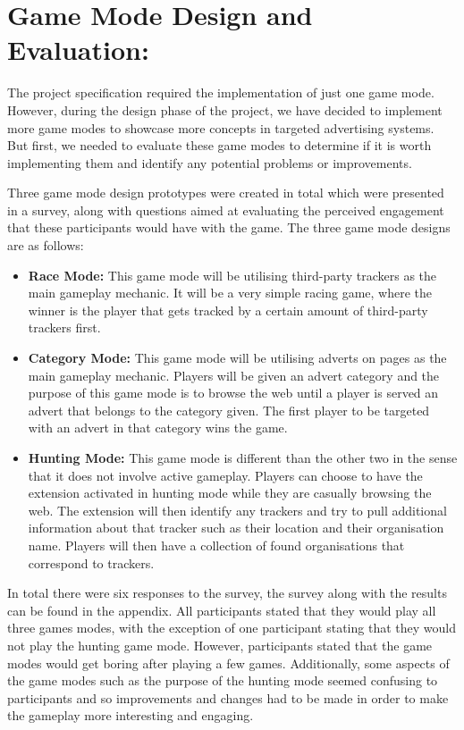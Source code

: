 \documentclass{l4proj}
\begin{document}
\section{Game Mode Design and Evaluation:}
The project specification required the implementation of just one game mode. However, during the design phase of the project, we have decided to implement more game modes to showcase more concepts in targeted advertising systems. But first, we needed to evaluate these game modes to determine if it is worth implementing them and identify any potential problems or improvements.

Three game mode design prototypes were created in total which were presented in a survey, along with questions aimed at evaluating the perceived engagement that these participants would have with the game. The three game mode designs are as follows:

\begin{itemize}
   \item
   \textbf{Race Mode:} This game mode will be utilising third-party trackers as the main gameplay mechanic. It will be a very simple racing game, where the winner is the player that gets tracked by a certain amount of third-party trackers first.

   \item
   \textbf{Category Mode:} This game mode will be utilising adverts on pages as the main gameplay mechanic. Players will be given an advert category and the purpose of this game mode is to browse the web until a player is served an advert that belongs to the category given. The first player to be targeted with an advert in that category wins the game.

   \item
   \textbf{Hunting Mode:} This game mode is different than the other two in the sense that it does not involve active gameplay. Players can choose to have the extension activated in hunting mode while they are casually browsing the web. The extension will then identify any trackers and try to pull additional information about that tracker such as their location and their organisation name. Players will then have a collection of found organisations that correspond to trackers.
\end{itemize}

In total there were six responses to the survey, the survey along with the results can be found in the appendix. All participants stated that they would play all three games modes, with the exception of one participant stating that they would not play the hunting game mode. However, participants stated that the game modes would get boring after playing a few games. Additionally, some aspects of the game modes such as the purpose of the hunting mode seemed confusing to participants and so improvements and changes had to be made in order to make the gameplay more interesting and engaging.
\end{document}

